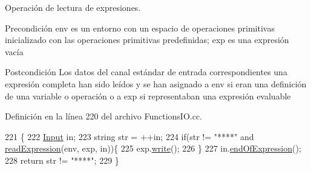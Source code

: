 Operación de lectura de expresiones. 

\begin{DoxyPrecond}{Precondición}
\textquotesingle{}env\textquotesingle{} es un entorno con un espacio de operaciones primitivas inicializado con las operaciones primitivas predefinidas; \textquotesingle{}exp\textquotesingle{} es una expresión vacía 
\end{DoxyPrecond}
\begin{DoxyPostcond}{Postcondición}
Los datos del canal estándar de entrada correspondientes una expresión completa han sido leídos y se han asignado a \textquotesingle{}env\textquotesingle{} si eran una definición de una variable o operación o a \textquotesingle{}exp\textquotesingle{} si representaban una expresión evaluable 
\end{DoxyPostcond}


Definición en la línea 220 del archivo Functions\+I\+O.\+cc.


\begin{DoxyCode}
221 \{
222   \hyperlink{class_input}{Input} in;
223   \textcolor{keywordtype}{string} str = ++in;
224   \textcolor{keywordflow}{if}(str != \textcolor{stringliteral}{"****"} and \hyperlink{_functions_i_o_8cc_a0c2a0ba0f4fe2dfe26ec14053ce4d408}{readExpression}(env, exp, in))\{
225     exp.\hyperlink{class_expression_a6d5d0fa496e3713c332c9f1edc269de5}{write}();
226   \}
227   in.\hyperlink{class_input_a326f5a9c81353747b9f525bb32dbc8df}{endOfExpression}();
228   \textcolor{keywordflow}{return} str != \textcolor{stringliteral}{"****"};
229 \}
\end{DoxyCode}
